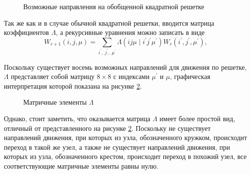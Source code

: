 \documentclass[utf8,12pt]{jetp}
\begin{document}
\begin{figure}[h]
	\caption{Возможные направления на обобщенной квадратной решетке}
	\label{dirgen}
\end{figure}

Так же как и в случае обычной квадратной решетки, вводится матрица коэффициентов $\Lambda$, а рекурсивные уравнения можно записать в виде
\begin{equation}
W_{r+1}(i, j, \mu) = \sum_{i^{'},\; j^{'},\; \mu^{'}} \Lambda (ij\mu\; |\; i^{'}j^{'}\mu^{'}) W_{r} (i^{'}, j^{'}, \mu^{'}),
\end{equation}

Поскольку существует восемь возможных направлений для движения по решетке, $\Lambda$ представляет собой матрицу $8 \times 8$ с индексами $\mu^{'}$ и $\mu$, графическая интерпретация которой показана на рисунке \ref{matxgen}. 

\begin{figure}[h]
	\caption{Матричные элементы $\Lambda$}
	\label{matxgen}
\end{figure}

Однако, стоит заметить, что оказывается матрица $\Lambda$ имеет более простой вид, отличный от представленного на рисунке  \ref{matxgen}. Поскольку не существует направлений движения, при которых из узла, обозначенного кружком, происходит переход в такой же узел, а также не существует направлений движения, при которых из узла, обозначенного крестом, происходит переход в похожий узел, все соответствующие матричные элементы равны нулю.
\end{document}
